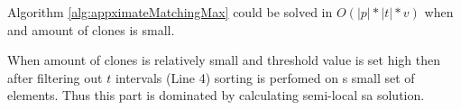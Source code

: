 \begin{corollary}
Algorithm \ref{alg:appximateMatchingMax} could  be solved in 
$ O(|p| * |t| * v )$ when  and amount of clones is small.

When amount of clones is relatively small and threshold value is set high  then after filtering out $t$ intervals (Line 4) sorting is perfomed on s small set of elements.
Thus this part is dominated by calculating semi-local sa solution.
\end{corollary}

  


 
